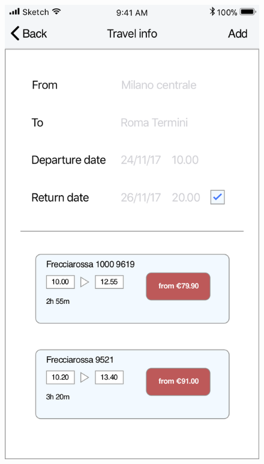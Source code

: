 \begin{enumerate}
\begin{figure}[H]
				\includegraphics[scale=0.25]{Images/Sketch/Trip_2}
				\hspace{0.5cm}

\end{figure}
\end{enumerate}

